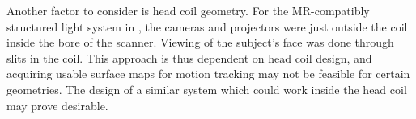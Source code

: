 \documentclass[class=article, crop=false]{standalone}
\begin{document}
\par
Another factor to consider is head coil geometry. For the MR-compatibly structured light system in \cite{Olesen2015a}, the cameras and projectors were just outside the coil inside the bore of the scanner. Viewing of the subject's face was done through slits in the coil. This approach is thus dependent on head coil design, and acquiring usable surface maps for motion tracking may not be feasible for certain geometries. The design of a similar system which could work inside the head coil may prove desirable.
\end{document}
